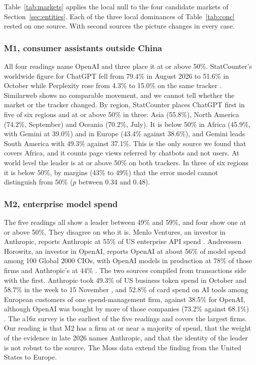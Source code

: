 \documentclass[11pt]{article}
\begin{document}
Table~\ref{tab:markets} applies the local null to the four candidate markets of Section~\ref{sec:entities}. Each of the three local dominances of Table~\ref{tab:conc} rested on one source. With second sources the picture changes in every case.

\subsubsection{M1, consumer assistants outside China} All four readings name OpenAI and three place it at or above 50\%. StatCounter's worldwide figure for ChatGPT fell from 79.4\% in August 2026 to 51.6\% in October while Perplexity rose from 4.3\% to 15.0\% on the same tracker \cite{statcounter2026}. Similarweb shows no comparable movement, and we cannot tell whether the market or the tracker changed. By region, StatCounter places ChatGPT first in five of six regions and at or above 50\% in three: Asia (55.8\%), North America (74.2\%, September) and Oceania (70.2\%, July). It is below 50\% in Africa (45.9\%, with Gemini at 39.0\%) and in Europe (43.4\% against 38.6\%), and Gemini leads South America with 49.3\% against 37.1\%. This is the only source we found that covers Africa, and it counts page views referred by chatbots and not users. At world level the leader is at or above 50\% on both trackers. In three of six regions it is below 50\%, by margins (43\% to 49\%) that the error model cannot distinguish from 50\% ($p$ between 0.34 and 0.48).

\subsubsection{M2, enterprise model spend} The five readings all show a leader between 49\% and 59\%, and four show one at or above 50\%. They disagree on who it is. Menlo Ventures, an investor in Anthropic, reports Anthropic at 55\% of US enterprise API spend \cite{menlo2026state}. Andreessen Horowitz, an investor in OpenAI, reports OpenAI at about 56\% of model spend among 100 Global 2000 CIOs, with OpenAI models in production at 78\% of those firms and Anthropic's at 44\% \cite{a16z2026cio}. The two sources compiled from transactions side with the first. Anthropic took 49.3\% of US business token spend in October and 58.7\% in the week to 15 November \cite{ramp2026index}, and 52.8\% of card spend on AI tools among European customers of one spend-management firm, against 38.5\% for OpenAI, although OpenAI was bought by more of those companies (73.2\% against 68.1\%) \cite{moss2026spend}. The a16z survey is the earliest of the five readings and covers the largest firms. Our reading is that M2 has a firm at or near a majority of spend, that the weight of the evidence in late 2026 names Anthropic, and that the identity of the leader is not robust to the source. The Moss data extend the finding from the United States to Europe.
\end{document}
